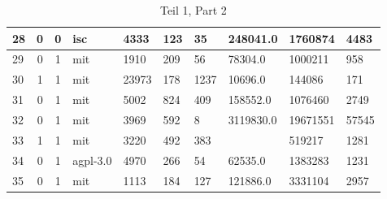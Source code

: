 \begin{landscape}
\begin{table}[h]
{\begin{tabular}{lcclllllll}
                28 & 0                          & 0                     & isc              & 4333             & 123                   & 35                           & 248041.0        & 1760874            & 4483                \\ \hline
                29 & 0                          & 1                     & mit              & 1910             & 209                   & 56                           & 78304.0         & 1000211            & 958                 \\ \hline
                30 & 1                          & 1                     & mit              & 23973            & 178                   & 1237                         & 10696.0         & 144086             & 171                 \\ \hline
                31 & 0                          & 1                     & mit              & 5002             & 824                   & 409                          & 158552.0        & 1076460            & 2749                \\ \hline
                32 & 0                          & 1                     & mit              & 3969             & 592                   & 8                            & 3119830.0       & 19671551           & 57545               \\ \hline
                33 & 1                          & 1                     & mit              & 3220             & 492                   & 383                          &                 & 519217             & 1281                \\ \hline
                34 & 0                          & 1                     & agpl-3.0         & 4970             & 266                   & 54                           & 62535.0         & 1383283            & 1231                \\ \hline
                35 & 0                          & 1                     & mit              & 1113             & 184                   & 127                          & 121886.0        & 3331104            & 2957
            \end{tabular}%
        }
        \caption*{Teil 1, Part 2}
    \end{table}
\end{landscape}

